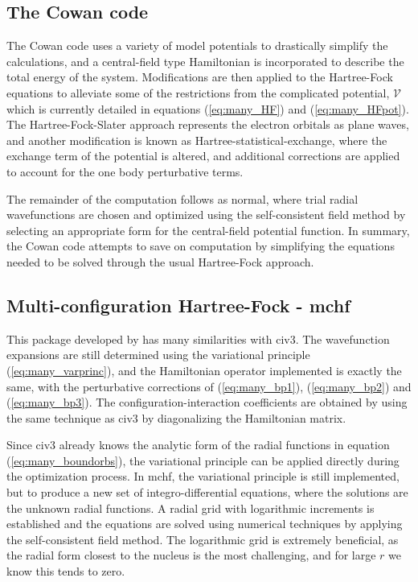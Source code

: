 \subsection{The Cowan code}\label{ssec:many_cowan}
The Cowan code \citep{1981tass.book.....C} uses a variety of model potentials to drastically simplify the calculations, and a central-field type Hamiltonian is incorporated to describe the total energy of the system. Modifications are then applied to the Hartree-Fock equations to alleviate some of the restrictions from the complicated potential, $\mathcal{V}$ which is currently detailed in equations (\ref{eq:many_HF}) and (\ref{eq:many_HFpot}). The Hartree-Fock-Slater approach represents the electron orbitals as plane waves, and another modification is known as Hartree-statistical-exchange, where the exchange term of the potential is altered, and additional corrections are applied to account for the one body perturbative terms.

The remainder of the computation follows as normal, where trial radial wavefunctions are chosen and optimized using the self-consistent field method by selecting an appropriate form for the central-field potential function. In summary, the Cowan code attempts to save on computation by simplifying the equations needed to be solved through the usual Hartree-Fock approach.

\subsection{Multi-configuration Hartree-Fock - {\sc mchf}}\label{ssec:many_mchf}
This package developed by \citet{1991CoPhC..64..369F} has many similarities with {\sc civ3}. The wavefunction expansions are still determined using the variational principle (\ref{eq:many_varprinc}), and the Hamiltonian operator implemented is exactly the same, with the perturbative corrections of (\ref{eq:many_bp1}), (\ref{eq:many_bp2}) and (\ref{eq:many_bp3}). The configuration-interaction coefficients are obtained by using the same technique as {\sc civ3} by diagonalizing the Hamiltonian matrix.

Since {\sc civ3} already knows the analytic form of the radial functions in equation (\ref{eq:many_boundorbs}), the variational principle can be applied directly during the optimization process. In {\sc mchf}, the variational principle is still implemented, but to produce a new set of integro-differential equations, where the solutions are the unknown radial functions. A radial grid with logarithmic increments is established and the equations are solved using numerical techniques by applying the self-consistent field method. The logarithmic grid is extremely beneficial, as the radial form closest to the nucleus is the most challenging, and for large $r$ we know this tends to zero.

